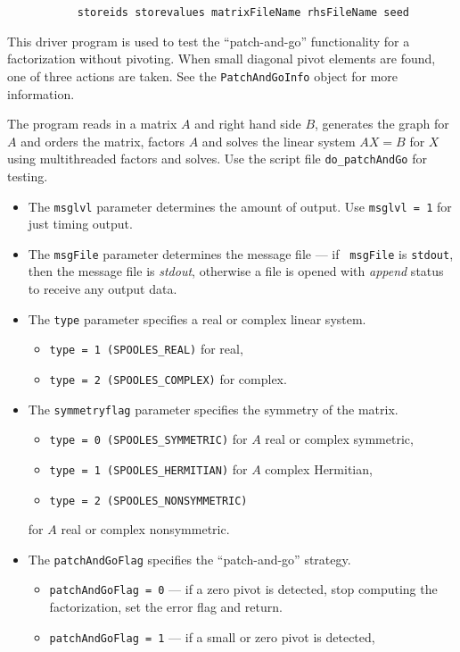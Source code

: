 \begin{enumerate}
\begin{verbatim}
           storeids storevalues matrixFileName rhsFileName seed 
\end{verbatim}
This driver program is used to test the ``patch-and-go''
functionality for a factorization without pivoting.
When small diagonal pivot elements are found, 
one of three actions are taken.
See the {\tt PatchAndGoInfo} object for more information.
\par
The program reads in a matrix $A$ and right hand side $B$,
generates the graph for $A$ and orders the matrix,
factors $A$ and solves the linear system $AX = B$ for $X$
using multithreaded factors and solves.
Use the script file {\tt do\_patchAndGo} for testing.
\par
\begin{itemize}
\item
The {\tt msglvl} parameter determines the amount of output.
Use {\tt msglvl = 1} for just timing output.
\item
The {\tt msgFile} parameter determines the message file --- if {\tt
msgFile} is {\tt stdout}, then the message file is {\it stdout},
otherwise a file is opened with {\it append} status to receive any
output data.
\item
The {\tt type} parameter specifies a real or complex linear system.
\begin{itemize}
\item
{\tt type = 1 (SPOOLES\_REAL)} for real,
\item
{\tt type = 2 (SPOOLES\_COMPLEX)} for complex.
\end{itemize}
\item
The {\tt symmetryflag} parameter specifies the symmetry of the matrix.
\begin{itemize}
\item
{\tt type = 0 (SPOOLES\_SYMMETRIC)} for $A$ real or complex symmetric,
\item
{\tt type = 1 (SPOOLES\_HERMITIAN)} for $A$ complex Hermitian,
\item
{\tt type = 2 (SPOOLES\_NONSYMMETRIC)}
\end{itemize}
for $A$ real or complex nonsymmetric.
\item
The {\tt patchAndGoFlag} specifies the ``patch-and-go'' strategy.
\begin{itemize}
\item
{\tt patchAndGoFlag = 0} --- if a zero pivot is detected, stop
computing the factorization, set the error flag and return.
\item
{\tt patchAndGoFlag = 1} --- if a small or zero pivot is detected,

\end{itemize}
\end{itemize}
\end{enumerate}
